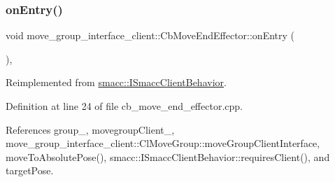 \mbox{\label{classmove__group__interface__client_1_1CbMoveEndEffector_acd7f50c949fcf6e7c56b285439b0b1de}} 
\subsubsection{\texorpdfstring{on\+Entry()}{onEntry()}}
{\footnotesize\ttfamily void move\+\_\+group\+\_\+interface\+\_\+client\+::\+Cb\+Move\+End\+Effector\+::on\+Entry (\begin{DoxyParamCaption}{ }\end{DoxyParamCaption})\hspace{0.3cm}{\ttfamily [override]}, {\ttfamily [virtual]}}



Reimplemented from \hyperlink{classsmacc_1_1ISmaccClientBehavior_a3ec24a839087c550e1d62a81e48cf530}{smacc\+::\+I\+Smacc\+Client\+Behavior}.



Definition at line 24 of file cb\+\_\+move\+\_\+end\+\_\+effector.\+cpp.



References group\+\_\+, movegroup\+Client\+\_\+, move\+\_\+group\+\_\+interface\+\_\+client\+::\+Cl\+Move\+Group\+::move\+Group\+Client\+Interface, move\+To\+Absolute\+Pose(), smacc\+::\+I\+Smacc\+Client\+Behavior\+::requires\+Client(), and target\+Pose.


